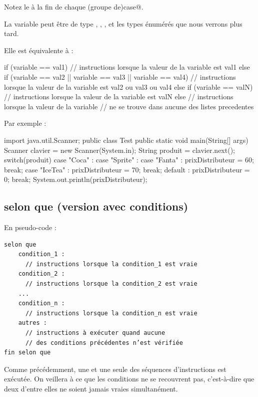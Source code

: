 \documentclass[11pt,a4paper]{article}
\begin{document}
        Notez le \verb@break@ \`a la fin de chaque (groupe de)\verb@ case@.
      
            \par
        
        La variable peut \^etre de type \verb@byte@, \verb@short@, 
        \verb@char@, \verb@int@\verb@String@ et 
        les types \'enum\'er\'es que nous verrons plus tard.
      
            \par
        
        Elle est \'equivalente \`a : 
      
            \par
        \begin{Java}
if (variable == val1){
      // instructions lorsque la valeur de la variable est val1
} else if (variable ==  val2 || variable ==  val3 || variable == val4){
      // instructions lorsque la valeur de la variable est val2 ou val3 ou val4
} else if (variable == valN){
      // instructions lorsque la valeur de la variable est valN
} else {
      // instructions lorsque la valeur de la variable
      // ne se trouve dans aucune des listes precedentes
}      \end{Java}Par exemple : 
            \par
        \begin{Java}
import java.util.Scanner;
public class Test{
  public static void main(String[] args){
      Scanner clavier = new Scanner(System.in);
      String produit = clavier.next();
      switch(produit) {
        case "Coca" :
        case "Sprite" :
        case "Fanta" :
        prixDistributeur = 60;
        break;
      case "IceTea" :
        prixDistributeur = 70;
        break;
      default :
        prixDistributeur = 0;
        break;
      }
      System.out.println(prixDistributeur);
    }
}
      \end{Java}\subsection{selon que (version avec conditions)}En pseudo-code :
            \par
        \begin{verbatim}
selon que
    condition_1 :
      // instructions lorsque la condition_1 est vraie
    condition_2 :
      // instructions lorsque la condition_2 est vraie
    ...
    condition_n :
      // instructions lorsque la condition_n est vraie
    autres :
      // instructions à exécuter quand aucune
      // des conditions précédentes n’est vérifiée
fin selon que
      \end{verbatim}
        Comme pr\'ec\'edemment, une et une seule des s\'equences d'instructions est ex\'ecut\'ee. On
        veillera \`a ce que les conditions ne se \guillemotleft  recouvrent \guillemotright  pas, c'est-\`a-dire que deux d'entre elles
        ne soient jamais vraies simultan\'ement. 
      
\end{document}
